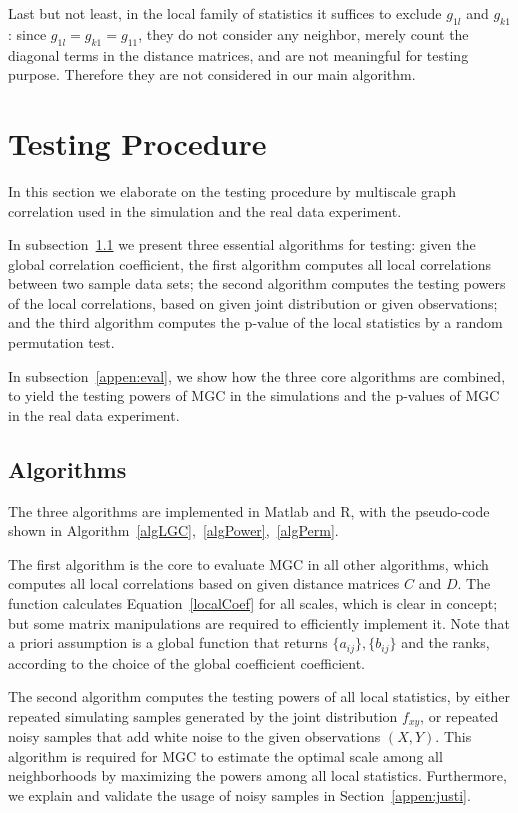 \documentclass[11pt]{article}
\begin{document}
Last but not least, in the local family of statistics it suffices to exclude $g_{1l}$ and $g_{k1}$: since $g_{1l}=g_{k1}=g_{11}$, they do not consider any neighbor, merely count the diagonal terms in the distance matrices, and are not meaningful for testing purpose. Therefore they are not considered in our main algorithm.

\section{Testing Procedure}
\label{appen:tests}

In this section we elaborate on the testing procedure by multiscale graph correlation used in the simulation and the real data experiment. 

In subsection~\ref{appen:algorithms} we present three essential algorithms for testing: given the global correlation coefficient, the first algorithm computes all local correlations between two sample data sets; the second algorithm computes the testing powers of the local correlations, based on given joint distribution or given observations; and the third algorithm computes the p-value of the local statistics by a random permutation test. 

In subsection~\ref{appen:eval}, we show how the three core algorithms are combined, to yield the testing powers of MGC in the simulations and the p-values of MGC in the real data experiment.

\subsection{Algorithms}
\label{appen:algorithms}
The three algorithms are implemented in Matlab and R, with the pseudo-code shown in Algorithm~\ref{algLGC},~\ref{algPower},~\ref{algPerm}.

The first algorithm is the core to evaluate MGC in all other algorithms, which computes all local correlations based on given distance matrices $C$ and $D$. The function calculates Equation~\ref{localCoef} for all scales, which is clear in concept; but some matrix manipulations are required to efficiently implement it. Note that a priori assumption is a global function that returns $\{a_{ij}\},\{b_{ij}\}$ and the ranks, according to the choice of the global coefficient coefficient.

The second algorithm computes the testing powers of all local statistics, by either repeated simulating samples generated by the joint distribution $f_{xy}$, or repeated noisy samples that add white noise to the given observations $(X, Y)$. This algorithm is required for MGC to estimate the optimal scale among all neighborhoods by maximizing the powers among all local statistics. Furthermore, we explain and validate the usage of noisy samples in Section~\ref{appen:justi}.
\end{document}
